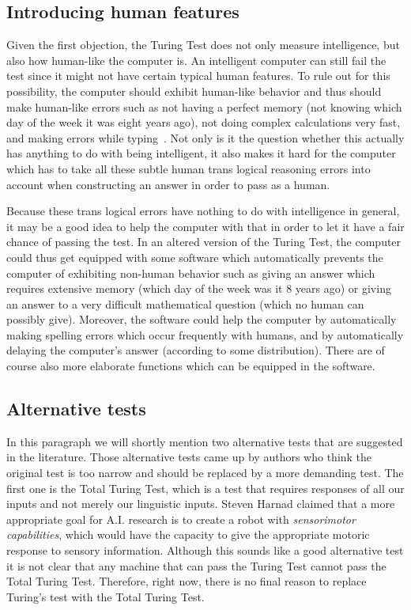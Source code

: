 \subsection{Introducing human features}
Given the first objection, the Turing Test does not only measure intelligence, but also how human-like the computer is. An intelligent computer can still fail the test since it might not have certain typical human features. To rule out for this possibility, the computer should exhibit human-like behavior and thus should make human-like errors such as not having a perfect memory (not knowing which day of the week it was eight years ago), not doing complex calculations very fast, and making errors while typing~\cite{epstein2009parsing}. Not only is it the question whether this actually has anything to do with being intelligent, it also makes it hard for the computer which has to take all these subtle human trans logical reasoning errors into account when constructing an answer in order to pass as a human.

Because these trans logical errors have nothing to do with intelligence in general, it may be a good idea to help the computer with that in order to let it have a fair chance of passing the test. In an altered version of the Turing Test, the computer could thus get equipped with some software which automatically prevents the computer of exhibiting non-human behavior such as giving an answer which requires extensive memory (which day of the week was it 8 years ago) or giving an answer to a very difficult mathematical question (which no human can possibly give). Moreover, the software could help the computer by automatically making spelling errors which occur frequently with humans, and by automatically delaying the computer's answer (according to some distribution). There are of course also more elaborate functions which can be equipped in the software.


\subsection{Alternative tests}
In this paragraph we will shortly mention two alternative tests that are suggested in the literature. Those alternative tests came up by authors who think the original test is too narrow and should be replaced by a more demanding test. The first one is the Total Turing Test, which is a test that requires responses of all our inputs and not merely our linguistic inputs. Steven Harnad claimed that a more appropriate goal for A.I. research is to create a robot with \textit{sensorimotor capabilities}, which would have the capacity to give the appropriate motoric response to sensory information. Although this sounds like a good alternative test it is not clear that any machine that can pass the Turing Test cannot pass the Total Turing Test. Therefore, right now, there is no final reason to replace Turing's test with the Total Turing Test.

